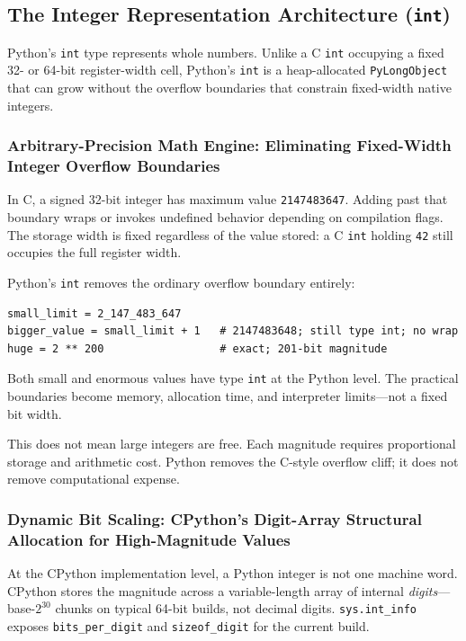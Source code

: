 \subsection{The Integer Representation Architecture (\texttt{int})}

Python's \texttt{int} type represents whole numbers. Unlike a C \texttt{int} occupying a fixed 32- or 64-bit register-width cell, Python's \texttt{int} is a heap-allocated \texttt{PyLongObject} that can grow without the overflow boundaries that constrain fixed-width native integers.

\subsubsection{Arbitrary-Precision Math Engine: Eliminating Fixed-Width Integer Overflow Boundaries}

In C, a signed 32-bit integer has maximum value \texttt{2147483647}. Adding past that boundary wraps or invokes undefined behavior depending on compilation flags. The storage width is fixed regardless of the value stored: a C \texttt{int} holding \texttt{42} still occupies the full register width.

Python's \texttt{int} removes the ordinary overflow boundary entirely:

\begin{verbatim}
small_limit = 2_147_483_647
bigger_value = small_limit + 1   # 2147483648; still type int; no wrap
huge = 2 ** 200                  # exact; 201-bit magnitude
\end{verbatim}

Both small and enormous values have type \texttt{int} at the Python level. The practical boundaries become memory, allocation time, and interpreter limits---not a fixed bit width.

This does not mean large integers are free. Each magnitude requires proportional storage and arithmetic cost. Python removes the C-style overflow cliff; it does not remove computational expense.

\subsubsection{Dynamic Bit Scaling: CPython's Digit-Array Structural Allocation for High-Magnitude Values}

At the CPython implementation level, a Python integer is not one machine word. CPython stores the magnitude across a variable-length array of internal \emph{digits}---base-\(2^{30}\) chunks on typical 64-bit builds, not decimal digits. \texttt{sys.int\_info} exposes \texttt{bits\_per\_digit} and \texttt{sizeof\_digit} for the current build.

